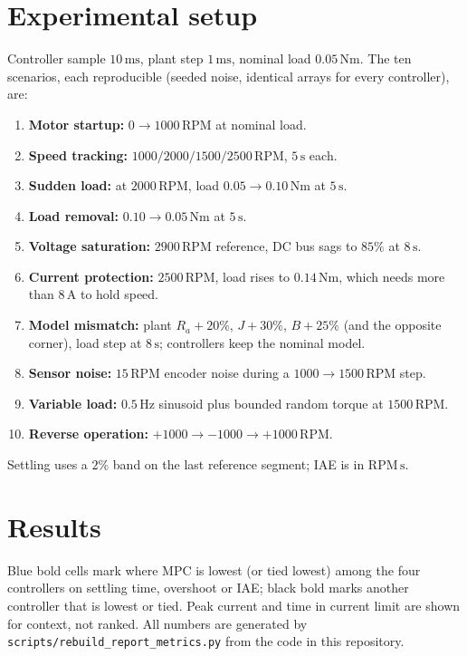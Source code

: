 \documentclass[11pt,a4paper]{article}
\begin{document}
\section{Experimental setup}
Controller sample \(10\,\si{\milli\second}\), plant step \(1\,\si{\milli\second}\), nominal load \(0.05\,\si{\newton\meter}\).
The ten scenarios, each reproducible (seeded noise, identical arrays for every controller), are:
\begin{enumerate}
  \item \textbf{Motor startup:} \(0\to1000\,\mathrm{RPM}\) at nominal load.
  \item \textbf{Speed tracking:} \(1000/2000/1500/2500\,\mathrm{RPM}\), \(5\,\si{\second}\) each.
  \item \textbf{Sudden load:} at \(2000\,\mathrm{RPM}\), load \(0.05\to0.10\,\si{\newton\meter}\) at \(5\,\si{\second}\).
  \item \textbf{Load removal:} \(0.10\to0.05\,\si{\newton\meter}\) at \(5\,\si{\second}\).
  \item \textbf{Voltage saturation:} \(2900\,\mathrm{RPM}\) reference, DC bus sags to \(85\%\) at \(8\,\si{\second}\).
  \item \textbf{Current protection:} \(2500\,\mathrm{RPM}\), load rises to \(0.14\,\si{\newton\meter}\), which needs more than \(8\,\si{\ampere}\) to hold speed.
  \item \textbf{Model mismatch:} plant \(R_a{+}20\%\), \(J{+}30\%\), \(B{+}25\%\) (and the opposite corner), load step at \(8\,\si{\second}\); controllers keep the nominal model.
  \item \textbf{Sensor noise:} \(15\,\mathrm{RPM}\) encoder noise during a \(1000\to1500\,\mathrm{RPM}\) step.
  \item \textbf{Variable load:} \(0.5\,\si{\hertz}\) sinusoid plus bounded random torque at \(1500\,\mathrm{RPM}\).
  \item \textbf{Reverse operation:} \(+1000\to-1000\to+1000\,\mathrm{RPM}\).
\end{enumerate}
Settling uses a \(2\%\) band on the last reference segment; IAE is in \(\mathrm{RPM\,s}\).

\section{Results}
Blue bold cells mark where MPC is lowest (or tied lowest) among the four controllers on settling time, overshoot or IAE; black bold marks another controller that is lowest or tied.
Peak current and time in current limit are shown for context, not ranked.
All numbers are generated by \texttt{scripts/rebuild\_report\_metrics.py} from the code in this repository.
\end{document}
